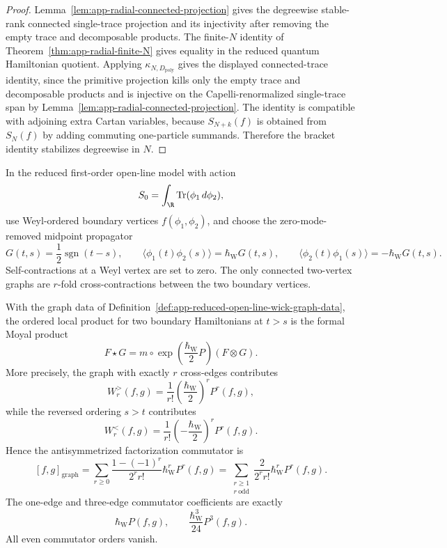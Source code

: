 \begin{proof}
  Lemma~\ref{lem:app-radial-connected-projection} gives the
  degreewise stable-rank connected single-trace projection and its
  injectivity after removing the empty trace and decomposable products.
  The finite-\(N\) identity of
  Theorem~\ref{thm:app-radial-finite-N} gives equality in the reduced
  quantum Hamiltonian quotient.  Applying \(\kappa_{N,D_{\mathrm{poly}}}\) gives the
  displayed connected-trace identity, since the primitive projection
  kills only the empty trace and decomposable products and is injective
  on the Capelli-renormalized single-trace span by
  Lemma~\ref{lem:app-radial-connected-projection}.  The identity is
  compatible with adjoining extra Cartan variables, because
  \(S_{N+k}(f)\) is obtained from \(S_N(f)\) by adding commuting
  one-particle summands.  Therefore the bracket identity stabilizes
  degreewise in \(N\).
\end{proof}

\begin{defn}
\label{def:app-reduced-open-line-wick-graph-data}
  In the reduced first-order open-line model with action
  \[
    S_0=\int_\R\operatorname{Tr}(\phi_1\,d\phi_2),
  \]
  use Weyl-ordered boundary vertices \(f(\phi_1,\phi_2)\), and choose
  the zero-mode-removed midpoint propagator
  \[
    G(t,s)=\frac12\operatorname{sgn}(t-s),\qquad
    \langle\phi_1(t)\phi_2(s)\rangle=\hbar_{\mathrm{W}} G(t,s),\qquad
    \langle\phi_2(t)\phi_1(s)\rangle=-\hbar_{\mathrm{W}} G(t,s).
  \]
  Self-contractions at a Weyl vertex are set to zero.  The only
  connected two-vertex graphs are \(r\)-fold cross-contractions between
  the two boundary vertices.
\end{defn}

\begin{thm}
\label{thm:app-reduced-open-line-moyal-product}
  With the graph data of
  Definition~\ref{def:app-reduced-open-line-wick-graph-data}, the
  ordered local product for two boundary Hamiltonians at \(t>s\) is
  the formal Moyal product
  \[
    F\star G=m\circ\exp\left(\frac{\hbar_{\mathrm{W}}}{2}P\right)(F\otimes G).
  \]
  More precisely, the graph with exactly \(r\) cross-edges contributes
  \[
    W_r^{>}(f,g)
      =
    \frac{1}{r!}\left(\frac{\hbar_{\mathrm{W}}}{2}\right)^rP^r(f,g),
  \]
  while the reversed ordering \(s>t\) contributes
  \[
    W_r^{<}(f,g)
      =
    \frac{1}{r!}\left(-\frac{\hbar_{\mathrm{W}}}{2}\right)^rP^r(f,g).
  \]
  Hence the antisymmetrized factorization commutator is
  \[
    [f,g]_{\mathrm{graph}}
      =
    \sum_{r\geq0}
      \frac{1-(-1)^r}{2^r r!}\hbar_{\mathrm{W}}^rP^r(f,g)
      =
    \sum_{\substack{r\geq1\\r\ \mathrm{odd}}}
      \frac{2}{2^r r!}\hbar_{\mathrm{W}}^rP^r(f,g).
  \]
  The one-edge and three-edge commutator coefficients are exactly
  \[
    \hbar_{\mathrm{W}} P(f,g),\qquad \frac{\hbar_{\mathrm{W}}^3}{24}P^3(f,g).
  \]
  All even commutator orders vanish.
\end{thm}

